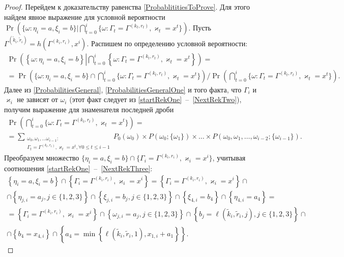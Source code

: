 \documentclass[a4paper,12pt,russian]{extarticle}
\newcommand{\ml}[1]{\begin{multline}#1\end{multline}}
\newcommand{\mll}[1]{\begin{multline*}#1\end{multline*}}
\begin{document}
\begin{proof}
Перейдем к доказательству равенства \eqref{ProbablititiesToProve}. Для этого найдем явное выражение для условной вероятности $\Pr (\{ \omega \colon \eta_i = a, \xi_i=b\} | \bigcap_{t=0}^{i}\{\omega\colon \Gamma_t=\Gamma^{(k_t,r_t)}, \varkappa_t=x^t\})$. Пусть $\Gamma^{(\tilde{k}_i,\tilde{r}_i)}=h(\Gamma^{(k_i,r_i)},x^i)$. Распишем по определению условной вероятности:
\ml
{
\Pr \left(\left\{ \omega \colon \eta_i = a, \xi_i=b\right\}  \left| \bigcap_{t=0}^{i}\left\{\omega\colon \Gamma_t=\Gamma^{(k_t,r_t)}, \varkappa_t=x^t\right\}\right.\right) = \\
=\Pr\left(\{ \omega \colon \eta_i = a, \xi_i=b \} \cap \bigcap_{t=0}^{i}\{\omega\colon \Gamma_t=\Gamma^{(k_t,r_t)}, \varkappa_t=x^t\}\right) \Big/
\Pr\left( \bigcap_{t=0}^{i}\{\omega\colon \Gamma_t=\Gamma^{(k_t,r_t)}, \varkappa_t=x^t\}\right).
\label{Construction:1}
}
Далее из \eqref{ProbabilitiesGeneral}, \eqref{ProbabilitiesGeneralOne} и того факта, что $\Gamma_i$ и $\varkappa_{i}$ не зависят от $\omega_i$ (этот факт следует из \eqref{startRekOne}~--~\eqref{NextRekTwo}), получим выражение для знаменателя последней дроби
\ml
{
\Pr\left( \bigcap_{t=0}^{i}\{\omega\colon \Gamma_t=\Gamma^{(k_t,r_t)}, \varkappa_t=x^t\}\right)=\\
=\sum_{\substack{\omega_0, \omega_1,\ldots \omega_{i-1} \colon \\ \Gamma_t=\Gamma^{(k_t,r_t)}, \varkappa_t=x^t, \forall 0\leqslant t \leqslant i-1}} P_0(\omega_0)\times P(\omega_0;\{\omega_1\})\times\ldots\times P(\omega_0,\omega_1,\ldots, \omega_{i-2};\{\omega_{i-1}\}).
\label{Construction:2}
}
Преобразуем множество $\{ \eta_i = a, \xi_i=b \} \cap \{\Gamma_i=\Gamma^{(k_i,r_i)}, \varkappa_i=x^i\}$, учитывая соотношения \eqref{startRekOne}~--~\eqref{NextRekThree}:
\mll
{
\left\{ \eta_i = a, \xi_i=b \right\} \cap \left\{\Gamma_i=\Gamma^{(k_i,r_i)}, \varkappa_i=x^i\right\} = \left\{\Gamma_i=\Gamma^{(k_i,r_i)}, \varkappa_i=x^i\right\} \cap\\
\cap \left\{ \eta_{j,i} = a_j, j\in \{1, 2, 3\}\right\} \cap \left\{ \xi_{j,i} = b_j, j\in \{1, 2, 3\}\right\} \cap \left\{ \xi_{4,i} = b_4 \right\} \cap  \left\{ \eta_{4,i} = a_4 \right\} = \\
= \left\{\Gamma_i=\Gamma^{(k_i,r_i)}, \varkappa_i=x^i\right\} \cap \left\{ \omega_{j,i} = a_j, j\in \{1, 2, 3\}\right\} \cap \left\{ b_j=\ell(\tilde{k}_i,\tilde{r}_i,j), j\in \{1, 2, 3\}\right\} \cap \\ 
\cap \left\{ b_4 = x_{4,i} \right\} \cap  \left\{ a_4=\min\left\{\ell(\tilde{k}_i,\tilde{r}_i,1), x_{1,i}+a_1\right\} \right\}. 
}

\end{proof}
\end{document}
